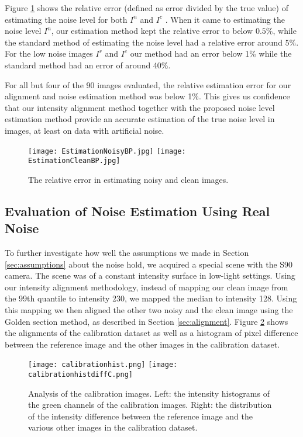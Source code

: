 \documentclass[review]{elsarticle}
\begin{document}
Figure \ref{fig:errorbp} shows the relative error (defined as error divided by the true value) of estimating the noise level for both $I^n$ and $I^c$ . When it came to estimating the noise level $I^n$, our estimation method kept the relative error to below $0.5\%$, while the standard method of estimating the noise level had a relative error around $5\%$. For the low noise images $I^r$ and $I^c$ our method had an error below 1\% while the standard method had an error of around 40\%.

For all but four of the 90 images evaluated, the relative estimation error for our alignment and noise estimation method was below 1\%. This gives us confidence that our intensity alignment method together with the proposed noise level estimation method provide an accurate estimation of the true noise level in images, at least on data with artificial noise.
\begin{figure}[t]
\vspace{-2mm}
\centering
\texttt{[image: EstimationNoisyBP.jpg]}
\texttt{[image: EstimationCleanBP.jpg]}
\vskip -3mm
\caption{The relative error in estimating noisy and clean images. }
\label{fig:errorbp}
\vspace{-4mm}
\end{figure}





\subsection{Evaluation of Noise Estimation Using Real Noise}

To further investigate how well the assumptions we made in Section \ref{sec:assumptions} about the noise hold, we acquired a special scene with the S90 camera. The scene was of a constant intensity surface in low-light settings. Using our intensity alignment methodology, instead of mapping our clean image from the 99th quantile to intensity 230, we mapped the median to intensity 128. Using this mapping we then aligned the other two noisy and the clean image using the Golden section method, as described in Section \ref{sec:alignment}. Figure \ref{fig:Calibration} shows the alignments of the calibration dataset as well as a histogram of pixel difference between the reference image and the other images in the calibration dataset.  
\begin{figure}[htb]
\vskip -4mm
\centering
\texttt{[image: calibrationhist.png]}
\texttt{[image: calibrationhistdiffC.png]}
\vskip -3mm
\caption{Analysis of the calibration images. Left: the intensity histograms of the green channels of the calibration images. Right: the distribution of the intensity difference between the reference image and the various other images in the calibration dataset. \label{fig:Calibration}}
\vspace{-4mm}
\end{figure}
\end{document}
